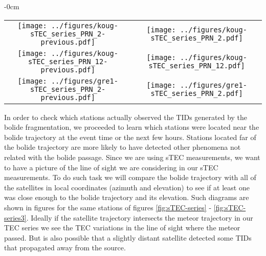 \begin{figure*}
    \centering
    \begin{adjustwidth}{-\extralength}{0cm}
    \begin{tabular}{cc}
    \texttt{[image: ../figures/koug-sTEC\_series\_PRN\_2-previous.pdf]} & \texttt{[image: ../figures/koug-sTEC\_series\_PRN\_2.pdf]}\\
    \texttt{[image: ../figures/koug-sTEC\_series\_PRN\_12-previous.pdf]} & \texttt{[image: ../figures/koug-sTEC\_series\_PRN\_12.pdf]}\\
    \texttt{[image: ../figures/gre1-sTEC\_series\_PRN\_2-previous.pdf]} & \texttt{[image: ../figures/gre1-sTEC\_series\_PRN\_2.pdf]}
    \end{tabular}
    \end{adjustwidth}
    \caption{Continuation of figures \ref{fig:sTEC-series} and \ref{fig:sTEC-series2}.}
    \label{fig:sTEC-series3}
\end{figure*}

In order to check which stations actually observed the TIDs generated by the bolide fragmentation, we proceeded to learn which stations were located near the bolide trajectory at the event time or the next few hours. Stations located far of the bolide trajectory are more likely to have detected other phenomena not related with the bolide passage. Since we are using sTEC measurements, we want to have a picture of the line of sight we are considering in our sTEC measurements. To do such task we will compare the bolide trajectory with all of the satellites in local coordinates (azimuth and elevation) to see if at least one was close enough to the bolide trajectory and its elevation. Such diagrams are shown in figures  for the same stations of figures \ref{fig:sTEC-series} - \ref{fig:sTEC-series3}. Ideally if the satellite trajectory intersects the meteor trajectory in our TEC series we see the TEC variations in the line of sight where the meteor passed. But is also possible that a slightly distant satellite detected some TIDs that propagated away from the source.

